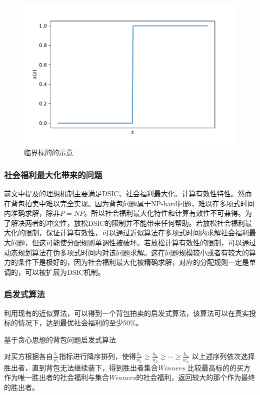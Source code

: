 \documentclass[promaster]{thesis-uestc}
\begin{document}
\begin{figure}[h]
    \includegraphics[width=350pt]{pic/jieyuefenpei.pdf}
    \caption{临界标的的示意}
    \label{criticalbid}
\end{figure}

\subsubsection{社会福利最大化带来的问题}
前文中提及的理想机制主要满足DSIC、社会福利最大化、计算有效性特性。然而在背包拍卖中难以完全实现。因为背包问题属于NP-hard问题，难以在多项式时间内准确求解，除非$P=NP$。所以社会福利最大化特性和计算有效性不可兼得。为了解决两者的冲突性，放松DSIC的限制并不能带来任何帮助。若放松社会福利最大化的限制，保证计算有效性，可以通过近似算法在多项式时间内求解社会福利最大问题，但这可能使分配规则单调性被破坏。若放松计算有效性的限制，可以通过动态规划算法在伪多项式时间内对该问题求解。这在问题规模较小或者有较大的算力的条件下是极好的，因为社会福利最大化被精确求解，对应的分配规则一定是单调的，可以被扩展为DSIC机制。

\subsubsection{启发式算法}
利用现有的近似算法，可以得到一个背包拍卖的启发式算法，该算法可以在真实投标的情况下，达到最优社会福利的至少50\%。

\begin{algorithm}[H]
\caption{基于贪心思想的背包问题启发式算法}
对买方根据各自$\frac{b_i}{w_i}$指标进行降序排列，使得$\frac{b_1}{w_1}\geq\frac{b_2}{w_2}\geq \cdots \geq \frac{b_n}{w_n}$\;
以上述序列依次选择胜出者，直到背包无法继续装下，得到胜出者集合$Winners$\;
比较最高标的的买方作为唯一胜出者的社会福利与集合$Winners$的社会福利，返回较大的那个作为最终的胜出者。\;
\end{algorithm}
\end{document}
